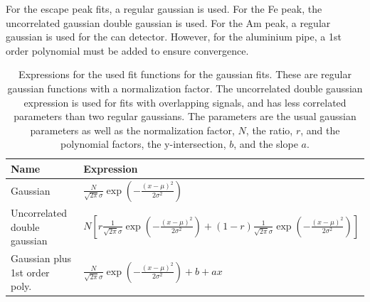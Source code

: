 For the escape peak fits, a regular gaussian is used. For the Fe peak, the uncorrelated gaussian double gaussian is used. For the Am peak, a regular gaussian is used for the can detector. However, for the aluminium pipe, a 1st order polynomial must be added to ensure convergence.

\begin{table}[htb!]
\begin{tabular}{ll}
\textbf{Name}                 & \textbf{Expression} \\ \hline
Gaussian                      & $\frac{N}{\sqrt{2\pi}\sigma}\exp{\left(-\frac{\left(x-\mu\right)^2}{2\sigma^2}\right)}$                    \\
Uncorrelated double gaussian  & $N\left[r\frac{1}{\sqrt{2\pi}\sigma}\exp{\left(-\frac{\left(x-\mu\right)^2}{2\sigma^2}\right)}+(1-r)\frac{1}{\sqrt{2\pi}\sigma}\exp{\left(-\frac{\left(x-\mu\right)^2}{2\sigma^2}\right)}\right]$                     \\
Gaussian plus 1st order poly. & $\frac{N}{\sqrt{2\pi}\sigma}\exp{\left(-\frac{\left(x-\mu\right)^2}{2\sigma^2}\right)} + b + ax$                   
\end{tabular}
\caption{Expressions for the used fit functions for the gaussian fits. These are regular gaussian functions with a normalization factor. The uncorrelated double gaussian expression is used for fits with overlapping signals, and has less correlated parameters than two regular gaussians. The parameters are the usual gaussian parameters as well as the normalization factor, $N$, the ratio, $r$, and the polynomial factors, the y-intersection, $b$, and the slope $a$.}
\label{tab:fitfuncchannelfits}
\end{table}


